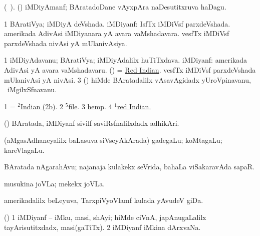 \bentry
{}
\gl{\nA}
\bmng
(\bava\ ). (\ca) iMDiyAmanf; BAratadoDane vAyxpAra naDesutitxruva haDagu. 
\emng
\eentry

\bentry
{}
\gl{\gu}
\bmng
\bnum
\num{1} BAratiVya; iMDiyA deVshada. 
 iMDiyanf: 
\banum
{} IsfTx iMDiVsf parxdeVshada. 
 amerikada AdivAsi iMDiyanara yA avara vaMshadavara. 
 vesfTx iMDiVsf parxdeVshada nivAsi yA mUlanivAsiya. 
\eanum
\numie
\enum
\emng
\eentry

\bentry
{}
\gl{\nA}
\bmng
\bnum
\num{1} iMDiyAdavanu; BAratiVya; iMDiyAdalilx huTiTxdava. 
 iMDiyanf: 
\banum
{} amerikada AdivAsi yA avara vaMshadavaru. 
\hypertarget{Indian(2)2b}{} 
 (\birx) = \hyperref{kandict_r.pdf}{R}{Red Indian}{Red Indian}. 
 vesfTx iMDiVsf parxdeVshada mUlanivAsi yA nivAsi. 
\eanum
\numie
\num{3} (\ca) hiMde BAratadalilx vAsavAgidadx yUroVpinavanu, \kanmu\ iMgilxSfnavanu. 
\enum
\emng

\noindent
\gl{\pagu}
\bmng
\bnum
\num{1}  = \hyperlink{Indian(2)2b}{$^2$Indian (2b)}. 
\num{2}  \hyperref{kandict_f.pdf}{F}{file(5) pagu(2)}{$^5$file}. 
\num{3}  \hyperref{kandict_h.pdf}{H}{hemp}{hemp}. 
\num{4} \hyperref{kandict_r.pdf}{R}{red}{$^1$red Indian.} 
\enum
\emng
\eentry

\bentry
{}
\gl{\nA}
\bmng
(\ca) BAratada, iMDiyanf sivilf saviRsfnalilxdadx adhikAri. 
\emng
\eentry

\bentry
{}
\gl{\nA}
\bmng
(aMgasAdhaneyalilx baLasuva siVseyAkArada) gadegaLu; koMtagaLu; kareVlagaLu.   
\emng
\eentry

\bentry
{}
\gl{\nA}
\bmng
BAratada nAgarahAvu; najanaja kulakekx seVrida, bahaLa viSakaravAda sapaR. 
\emng
\eentry

\bentry
{}
\gl{\nA}
\bmng
musukina joVLa; mekekx joVLa. 
\emng
\eentry

\bentry
{}
\gl{\nA}
\bmng
amerikadalilx beLeyuva, TarxpiVyoVlamf kulada yAvudeV giDa. 
\emng
\eentry

\bentry
{}
\gl{\nA}
\bmng
(\birx) 
\bnum
\num{1} iMDiyanf -- iMku, masi, shAyi; hiMde ciVnA, japAnugaLalilx tayArisutitxdadx, masi(gaTiTx). 
\num{2} iMDiyanf iMkina dArxvaNa. 
\enum
\emng
\eentry

